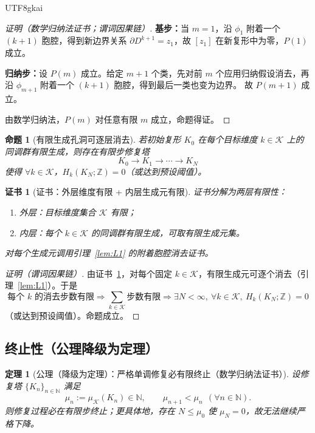 \documentclass[12pt]{article}
\newtheorem{theorem}{定理}[section]
\newtheorem{proposition}{命题}[section]
\newtheorem{Certificate}{证书}[section]
\begin{document}
\begin{CJK*}{UTF8}{gkai}
\begin{proof}[证明（数学归纳法证书；谓词因果链）]
\textbf{基步：}当 $m=1$，沿 $\phi_1$ 附着一个 $(k+1)$ 胞腔，得到新边界关系 $\partial D^{k+1}=z_1$，故 $[z_1]$ 在新复形中为零，$P(1)$ 成立。

\textbf{归纳步：}设 $P(m)$ 成立。给定 $m+1$ 个类，先对前 $m$ 个应用归纳假设消去，再沿 $\phi_{m+1}$ 附着一个 $(k+1)$ 胞腔，得到最后一类也变为边界。
故 $P(m+1)$ 成立。

由数学归纳法，$P(m)$ 对任意有限 $m$ 成立，命题得证。
\end{proof}

\begin{proposition}[有限生成孔洞可逐层消去]
\label{prop:P1}
若初始复形 $K_0$ 在每个目标维度 $k\in\mathcal K$ 上的同调群有限生成，则存在有限步修复塔
\[
K_0\to K_1\to\cdots\to K_N
\]
使得 $\forall k\in\mathcal K$，$H_k(K_N;\mathbb Z)=0$（或达到预设阈值）。
\end{proposition}

\begin{Certificate}[证书：外层维度有限 + 内层生成元有限]
\label{cert:P1}
证书分解为两层有限性：
\begin{enumerate}
\item 外层：目标维度集合 $\mathcal K$ 有限；
\item 内层：每个 $k\in\mathcal K$ 的同调群有限生成，可取有限生成元集。
\end{enumerate}
对每个生成元调用引理~\ref{lem:L1} 的附着胞腔消去证书。
\end{Certificate}

\begin{proof}[证明（谓词因果链）]
由证书~\ref{cert:P1}，对每个固定 $k\in\mathcal K$，有限生成元可逐个消去（引理~\ref{lem:L1}）。于是
\[
\text{每个 }k\text{ 的消去步数有限}
\Rightarrow
\sum_{k\in\mathcal K}\text{步数有限}
\Rightarrow
\exists N<\infty,\ \forall k\in\mathcal K,\ H_k(K_N;\mathbb Z)=0
\]
（或达到预设阈值）。命题成立。
\end{proof}

\subsection{终止性（公理降级为定理）}

\begin{theorem}[公理（降级为定理）：严格单调修复必有限终止（数学归纳法证书）]
\label{thm:T4}
设修复塔 $\{K_n\}_{n\in\mathbb N}$ 满足
\[
\mu_n:=\mu_{\mathcal K}(K_n)\in\mathbb N,
\qquad
\mu_{n+1}<\mu_n\ \ (\forall n\in\mathbb N).
\]
则修复过程必在有限步终止；更具体地，存在 $N\le \mu_0$ 使 $\mu_N=0$，故无法继续严格下降。
\end{theorem}


\end{CJK*}
\end{document}
